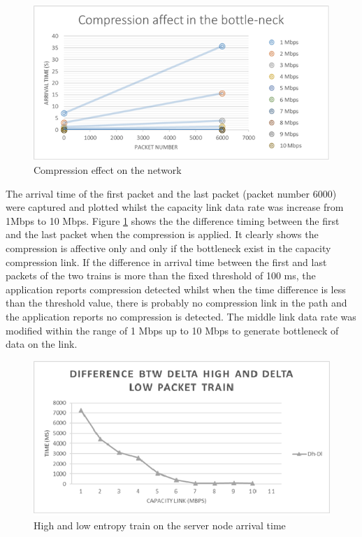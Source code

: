 \documentclass[sigconf]{acmart}
\begin{document}
 \begin{figure}[h]
  \centering
  \includegraphics[width=\linewidth]{2}
  \caption{Compression effect on the network}
  \label{f2}
\end{figure} 


The arrival time of the first packet and the last packet (packet number 6000) were captured and plotted whilst the capacity link data rate was increase from 1Mbps to 10 Mbps. Figure \ref{f2} shows the the difference timing between the first and the last packet when the compression is applied. It clearly shows the compression is affective only and only if the bottleneck exist in the capacity compression link. 
If the difference in arrival time between the first and last packets of the two trains is more than the fixed threshold of 100 ms, the application reports compression detected whilst when the time difference is less than the threshold value, there is probably no compression link in the path and the application reports no compression is detected. The middle link data rate was modified within the range of 1 Mbps up to 10 Mbps to generate bottleneck of data on the link. 

 \begin{figure}[h]
  \centering
  \includegraphics[width=\linewidth]{3}
  \caption{High and low entropy train on the server node arrival time }
  \label{t1}
\end{figure} 
\end{document}
